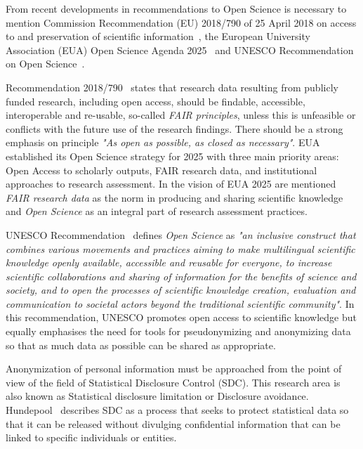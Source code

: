 \documentclass{article}
\begin{document}
From recent developments in recommendations to Open Science is necessary to mention Commission Recommendation (EU) 2018/790 of 25 April 2018 on access to and preservation of scientific information~\cite{2018_EU_2018/790}, the European University Association (EUA) Open Science Agenda 2025~\cite{2022_EUA} and UNESCO Recommendation on Open Science~\cite{2021_UNESCO}.

Recommendation 2018/790~\cite{2018_EU_2018/790} states that research data resulting from publicly funded research, including open access, should be findable, accessible, interoperable and re-usable, so-called \textit{FAIR principles}, unless this is unfeasible or conflicts with the future use of the research findings. There should be a strong emphasis on principle \textit{"As open as possible, as closed as necessary"}. 
EUA~\cite{2022_EUA} established its Open Science strategy for 2025 with three main priority areas: Open Access to scholarly outputs, FAIR research data, and institutional approaches to research assessment. In the vision of EUA 2025 are mentioned \textit{FAIR research data} as the norm in producing and sharing scientific knowledge and \textit{Open Science} as an integral part of research assessment practices.

UNESCO Recommendation~\cite{2021_UNESCO} defines \textit{Open Science} as \textit{"an
inclusive construct that combines various movements and practices aiming
to make multilingual scientific knowledge openly available, accessible and
reusable for everyone, to increase scientific collaborations and sharing of
information for the benefits of science and society, and to open the processes of scientific knowledge creation, evaluation and communication to societal actors beyond the traditional scientific community"}. In this recommendation, UNESCO promotes open access to scientific knowledge but equally emphasises the need for tools for pseudonymizing and anonymizing data so that as much data as possible can be shared as appropriate.
\newline

Anonymization of personal information must be approached from the point of view 
of the field of Statistical Disclosure Control (SDC). This research area is also known as Statistical disclosure limitation or Disclosure avoidance.
Hundepool~\cite{2012_Hundepool} describes SDC as a process that seeks to protect statistical data so that it can be released without divulging confidential information that can be linked to specific individuals or entities.
\end{document}
